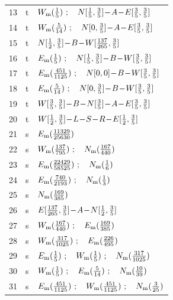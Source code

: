 \begin{longtable}{@{}rcp{}@{}}
13 & t & \(W_{\rm m}(\frac{1}{5})\ ;\quad N[\frac{1}{5},\frac{3}{5}]\! -\! A\! -\! E[\frac{3}{5},\frac{3}{5}]\)\\[2pt]
14 & t & \(W_{\rm m}(\frac{5}{14})\ ;\quad N[0,\frac{3}{5}]\! -\! A\! -\! E[\frac{3}{5},\frac{3}{5}]\)\\[2pt]
15 & t & \(N[\frac{1}{2},\frac{3}{5}]\! -\! B\! -\! W[\frac{137}{265},\frac{3}{5}]\)\\[2pt]
16 & t & \(E_{\rm m}(\frac{1}{5})\ ;\quad N[\frac{1}{5},\frac{3}{5}]\! -\! B\! -\! W[\frac{3}{5},\frac{3}{5}]\)\\[2pt]
17 & t & \(E_{\rm m}(\frac{451}{1125})\ ;\quad N[0,0]\! -\! B\! -\! W[\frac{3}{5},\frac{3}{5}]\)\\[2pt]
18 & t & \(E_{\rm m}(\frac{5}{14})\ ;\quad N[0,\frac{3}{5}]\! -\! B\! -\! W[\frac{3}{5},\frac{3}{5}]\)\\[2pt]
19 & t & \(\htV{W}{\frac{3}{5},\frac{3}{5}}\! -\! B\! -\! \htV{N}{\frac{3}{5}}\! -\! A\! -\! \htV{E}{\frac{3}{5},\frac{3}{5}}\)\\[2pt]
20 & t & \(\htV{W}{\frac{1}{2},\frac{3}{5}}\! -\! L\! -\! S\! -\! R\! -\! \htV{E}{\frac{1}{2},\frac{3}{5}}\)\\[2pt]
21 & s & \(E_{\rm m}(\frac{11329}{25630})\)\\[2pt]
22 & s & \(W_{\rm m}(\frac{137}{795})\ ;\quad N_{\rm m}(\frac{167}{440})\)\\[2pt]
23 & s & \(E_{\rm m}(\frac{22429}{58525})\ ;\quad N_{\rm m}(\frac{1}{6})\)\\[2pt]
24 & s & \(E_{\rm m}(\frac{740}{2193})\ ;\quad N_{\rm m}(\frac{1}{3})\)\\[2pt]
25 & s & \(N_{\rm m}(\frac{169}{385})\)\\[2pt]
26 & s & \(E[\frac{137}{265},\frac{3}{5}]\! -\! A\! -\! N[\frac{1}{2},\frac{3}{5}]\)\\[2pt]
27 & s & \(W_{\rm m}(\frac{167}{440})\ ;\quad E_{\rm m}(\frac{169}{385})\)\\[2pt]
28 & s & \(W_{\rm m}(\frac{317}{1025})\ ;\quad E_{\rm m}(\frac{226}{495})\)\\[2pt]
29 & s & \(\htM{E}{\frac{1}{5}}\ ;\quad \htM{W}{\frac{1}{5}}\ ;\quad \htM{N}{\frac{317}{1025}}\)\\[2pt]
30 & s & \(\htM{W}{\frac{1}{5}}\ ;\quad \htM{E}{\frac{5}{14}}\ ;\quad \htM{N}{\frac{10}{39}}\)\\[2pt]
31 & s & \(E_{\rm m}(\frac{451}{1125})\ ;\quad W_{\rm m}(\frac{451}{1125})\ ;\quad N_{\rm m}(\frac{3}{25})\)\\[2pt]

\end{longtable}
